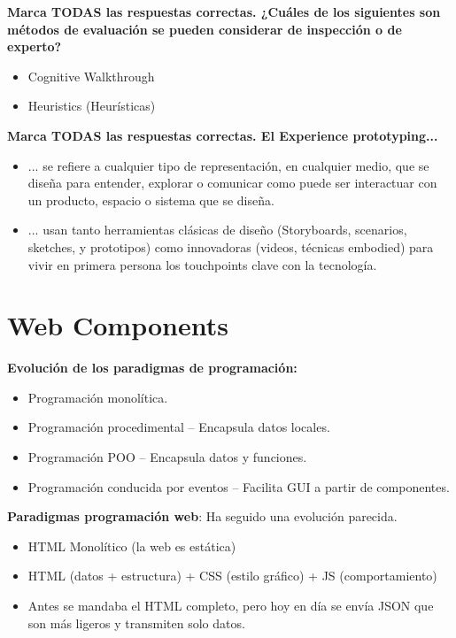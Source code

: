 \documentclass[12pt, twoside, openright]{report} %
\begin{document}
\textbf{Marca TODAS las respuestas correctas. ¿Cuáles de los siguientes son métodos de evaluación se pueden considerar de inspección o de experto?}
\begin{itemize}
	\item Cognitive Walkthrough
	\item Heuristics (Heurísticas)
\end{itemize}

\textbf{Marca TODAS las respuestas correctas. El Experience prototyping...}
\begin{itemize}
	\item ... se refiere a cualquier tipo de representación, en cualquier medio, que se diseña para entender, explorar o comunicar como puede ser interactuar con un producto, espacio o sistema que se diseña.
	\item ... usan tanto herramientas clásicas de diseño (Storyboards, scenarios, sketches, y prototipos) como innovadoras (videos, técnicas embodied) para vivir en primera persona los touchpoints clave con la tecnología.
\end{itemize}


\chapter{Web Components}

\textbf{Evolución de los paradigmas de programación:}

\begin{itemize}
	\item Programación monolítica.
	\item Programación procedimental -- Encapsula datos locales.
	\item Programación POO -- Encapsula datos y funciones.
	\item Programación conducida por eventos -- Facilita GUI a partir de componentes.
\end{itemize}

\textbf{Paradigmas programación web}: Ha seguido una evolución parecida.

\begin{itemize}
	\item HTML Monolítico (la web es estática)
	\item HTML (datos + estructura) + CSS (estilo gráfico) + JS (comportamiento)
	\item Antes se mandaba el HTML completo, pero hoy en día se envía JSON que son más ligeros y transmiten solo datos.
\end{itemize}
\end{document}

